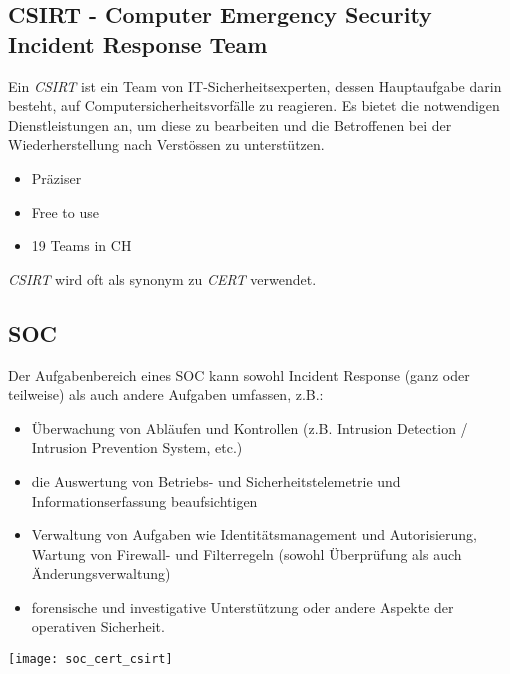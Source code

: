 \subsection{CSIRT - Computer Emergency Security Incident Response Team}
Ein \textit{CSIRT} ist ein Team von IT-Sicherheitsexperten, dessen Hauptaufgabe darin besteht, auf Computersicherheitsvorfälle zu reagieren.
Es bietet die notwendigen Dienstleistungen an, um diese zu bearbeiten und die Betroffenen bei der Wiederherstellung nach Verstössen zu unterstützen.\\

\begin{itemize}
    \item Präziser
    \item Free to use
    \item 19 Teams in CH\\
\end{itemize}

\textit{CSIRT} wird oft als synonym zu \textit{CERT} verwendet.

\subsection{SOC}
Der Aufgabenbereich eines SOC kann sowohl Incident Response (ganz oder teilweise) als auch andere Aufgaben umfassen, z.B.:

\begin{itemize}
    \item Überwachung von Abläufen und Kontrollen (z.B. Intrusion Detection / Intrusion Prevention System, etc.)
    \item die Auswertung von Betriebs- und Sicherheitstelemetrie und Informationserfassung beaufsichtigen
    \item Verwaltung von Aufgaben wie Identitätsmanagement und Autorisierung, Wartung von Firewall- und Filterregeln (sowohl Überprüfung als auch Änderungsverwaltung)
    \item forensische und investigative Unterstützung oder andere Aspekte der operativen Sicherheit.
\end{itemize}

\begin{center}
    \vspace{-8pt}
    \texttt{[image: soc\_cert\_csirt]}
    \vspace{-8pt}
\end{center}

\newpage

